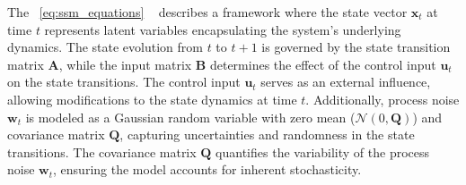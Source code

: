 The ~\cref{eq:ssm_equations} ~\cite{gu2022structured} describes a framework where the state vector \( \mathbf{x}_t \) at time \( t \) represents latent variables encapsulating the system's underlying dynamics. The state evolution from \( t \) to \( t+1 \) is governed by the state transition matrix \( \mathbf{A} \), while the input matrix \( \mathbf{B} \) determines the effect of the control input \( \mathbf{u}_t \) on the state transitions. The control input \( \mathbf{u}_t \) serves as an external influence, allowing modifications to the state dynamics at time \( t \). Additionally, process noise \( \mathbf{w}_t \) is modeled as a Gaussian random variable with zero mean (\( \mathcal{N}(0, \mathbf{Q}) \)) and covariance matrix \( \mathbf{Q} \), capturing uncertainties and randomness in the state transitions. The covariance matrix \( \mathbf{Q} \) quantifies the variability of the process noise \( \mathbf{w}_t \), ensuring the model accounts for inherent stochasticity.\\
